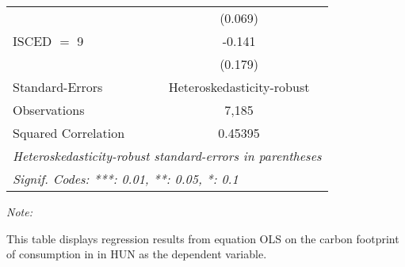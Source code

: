 \begin{table}[htbp!]
\begin{adjustbox}{width = 1\textwidth, max height = 0.95\textheight, center}
\begin{threeparttable}[b]
\begin{tabular}{lc}
                                & (0.069)\\   
            ISCED $=$ 9         & -0.141\\   
                                & (0.179)\\   
            \midrule 
            Standard-Errors     & Heteroskedasticity-robust \\   
            Observations        & 7,185\\  
            Squared Correlation & 0.45395\\  
            \midrule \midrule
            \multicolumn{2}{l}{\emph{Heteroskedasticity-robust standard-errors in parentheses}}\\
            \multicolumn{2}{l}{\emph{Signif. Codes: ***: 0.01, **: 0.05, *: 0.1}}\\
         \end{tabular}
         
         \begin{tablenotes}\item \medskip \textit{Note:}
            \item This table displays regression results from equation OLS on the carbon footprint of consumption in  in HUN as the dependent variable.  
         \end{tablenotes}
      \end{threeparttable}
   \end{adjustbox}
\end{table}


